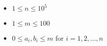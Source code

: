 \begin{itemize}
\tightlist
\item $1 \leq n \leq 10^5$
\item $1 \leq m \leq 100$
\item $0 \leq a_i,b_i \leq m$ for $i = 1,2,\ldots,n$
\end{itemize}
